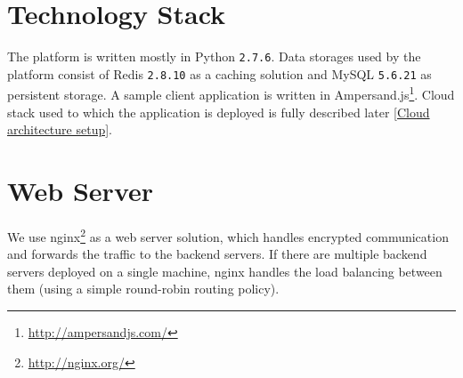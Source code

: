 \documentclass{uvamscse}
\begin{document}
\section{Technology Stack} \label{Technology Stack}

The platform is written mostly in Python \texttt{2.7.6}. Data storages used by the platform consist of Redis \texttt{2.8.10} as a caching solution and MySQL \texttt{5.6.21} as persistent storage. A sample client application is written in Ampersand.js\footnote{\url{http://ampersandjs.com/}}. Cloud stack used to which the application is deployed is fully described later \ref{Cloud architecture setup}.

\section{Web Server}

We use nginx\footnote{\url{http://nginx.org/}} as a web server solution, which handles encrypted communication and forwards the traffic to the backend servers. If there are multiple backend servers deployed on a single machine, nginx handles the load balancing between them (using a simple round-robin routing policy).


\end{document}
